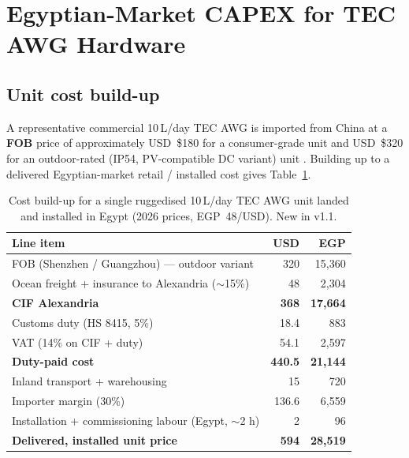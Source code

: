 \documentclass[11pt,a4paper]{article}
\begin{document}
\section{Egyptian-Market CAPEX for TEC AWG Hardware}
\label{sec:egy_capex}

\subsection{Unit cost build-up}
A representative commercial 10\,L/day TEC AWG is imported from China at a \textbf{FOB} price of approximately USD~\$180 for a consumer-grade unit and USD~\$320 for an outdoor-rated (IP54, PV-compatible DC variant) unit \citep{alibaba_awg_listings_2025}. Building up to a delivered Egyptian-market retail / installed cost gives Table~\ref{tab:egy_unit_cost}.

\begin{table}[h]
\centering\small
\caption{Cost build-up for a single ruggedised 10\,L/day TEC AWG unit landed and installed in Egypt (2026 prices, EGP~48/USD). New in v1.1.}
\label{tab:egy_unit_cost}
\begin{tabular}{@{}lrr@{}}
\toprule
\textbf{Line item} & \textbf{USD} & \textbf{EGP}\\
\midrule
FOB (Shenzhen / Guangzhou) --- outdoor variant          & 320   & 15{,}360 \\
Ocean freight + insurance to Alexandria ($\sim$15\%)    & 48    & 2{,}304 \\
\textbf{CIF Alexandria}                                  & \textbf{368}   & \textbf{17{,}664} \\
Customs duty (HS 8415, 5\%)                              & 18.4  & 883 \\
VAT (14\% on CIF + duty)                                 & 54.1  & 2{,}597 \\
\textbf{Duty-paid cost}                                  & \textbf{440.5} & \textbf{21{,}144} \\
Inland transport + warehousing                           & 15    & 720 \\
Importer margin (30\%)                                   & 136.6 & 6{,}559 \\
Installation + commissioning labour (Egypt, $\sim$2 h)   & 2     & 96 \\
\textbf{Delivered, installed unit price}                 & \textbf{594}   & \textbf{28{,}519} \\
\bottomrule
\end{tabular}
\end{table}
\end{document}
